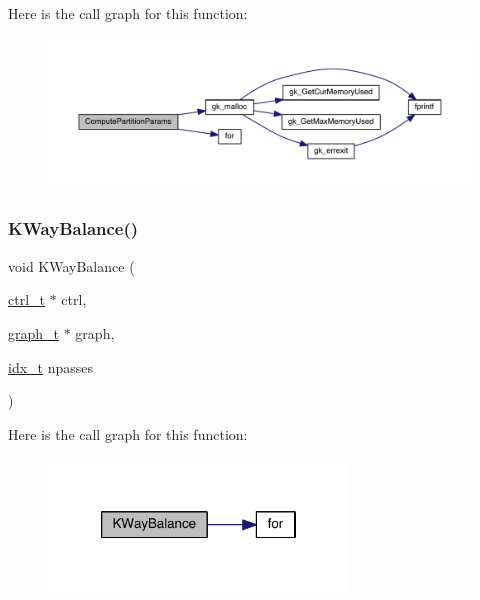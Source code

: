 Here is the call graph for this function\+:\nopagebreak
\begin{figure}[H]
\begin{center}
\leavevmode
\includegraphics[width=350pt]{a00918_a2fdeee823a8743e900301c088677bdf3_cgraph}
\end{center}
\end{figure}
\mbox{\label{a00918_a2411a874a11b4660effe52a3b3c4c701}} 
\subsubsection{\texorpdfstring{K\+Way\+Balance()}{KWayBalance()}}
{\footnotesize\ttfamily void K\+Way\+Balance (\begin{DoxyParamCaption}\item[{\hyperlink{a00742}{ctrl\+\_\+t} $\ast$}]{ctrl,  }\item[{\hyperlink{a00734}{graph\+\_\+t} $\ast$}]{graph,  }\item[{\hyperlink{a00876_aaa5262be3e700770163401acb0150f52}{idx\+\_\+t}}]{npasses }\end{DoxyParamCaption})}

Here is the call graph for this function\+:\nopagebreak
\begin{figure}[H]
\begin{center}
\leavevmode
\includegraphics[width=226pt]{a00918_a2411a874a11b4660effe52a3b3c4c701_cgraph}
\end{center}
\end{figure}
\mbox{\label{a00918_aa8348aa8c00e61bdc9f77041bea6eba9}} 
